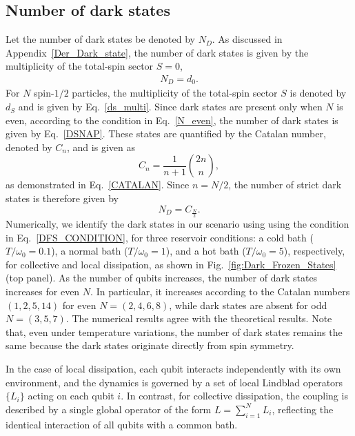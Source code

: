 \documentclass[aps,superscriptaddress,twocolumn,pre,longbibliography,floatfix]{revtex4-1}
\begin{document}
	
	
	\subsection{Number of  dark states}
	Let the number of dark states be denoted by $N_D$. As discussed in Appendix~\ref{Der_Dark_state}, the number of  dark states is given by the multiplicity of the total-spin sector $S=0$,
	\begin{align}
		N_D = d_0 .
	\end{align}
	For $N$ spin-$1/2$ particles, the multiplicity of the total-spin sector $S$ is denoted by $d_S$ and is given by Eq.~\eqref{ds_multi}. Since dark states are present only when $N$ is even, according to the condition in Eq.~\eqref{N_even}, the number of dark states is given by Eq.~\eqref{DSNAP}. These states are quantified by the Catalan number, denoted by $C_n$, and is given as
	\begin{equation}
		C_n=\frac{1}{n+1}\binom{2n}{n}, 
	\end{equation}
	as demonstrated in Eq.~\eqref{CATALAN}. Since $n=N/2$, the number of strict dark states is therefore given by
	\begin{equation}
		N_D = C_{\frac{N}{2}}.
	\end{equation}		
	Numerically, we identify the dark states in our scenario using using the condition in Eq.~\eqref{DFS_CONDITION}, for three reservoir conditions: a cold bath ($T/\omega_0 = 0.1$), a normal bath ($T/\omega_0 = 1$), and a hot bath ($T/\omega_0 = 5$), respectively, for collective and local dissipation, as shown in Fig.~\ref{fig:Dark_Frozen_States} (top panel). As the number of qubits increases, the number of dark states increases for even $N$. In particular, it increases according to the Catalan numbers $(1,2,5,14)$ for even $N=(2,4,6,8)$, while dark states are absent for odd $N=(3,5,7)$. The numerical results agree with the theoretical results. Note that, even under temperature variations, the number of dark states remains the same because the dark states originate directly from spin symmetry.
	
	In the case of local dissipation, each qubit interacts independently with its own environment, and the dynamics is governed by a set of local Lindblad operators $\{L_i\}$ acting on each qubit $i$. In contrast, for collective dissipation, the coupling is described by a single global operator of the form $L = \sum_{i=1}^{N} L_i$, reflecting the identical interaction of all qubits with a common bath.
	
\end{document}
